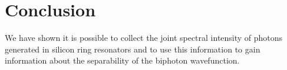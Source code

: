 \newpage
\section{Conclusion}
We have shown it is possible to collect the joint spectral intensity of photons generated in silicon ring resonators and to use this information to gain information about the separability of the biphoton wavefunction. 

